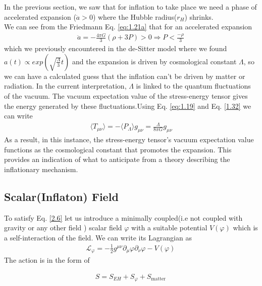 \hspace{0.5cm}In the previous section, we saw that for inflation to take place we need  a phase of accelerated expansion ($\ddot{a} > 0$) where the Hubble radius($r_{H}$) shrinks.\\
We can see from the Friedmann Eq. \ref{eq:1.21a} that for an accelerated expansion
\begin{align}
    \ddot{a} = -\frac{4 \pi G}{3}(\rho+3P) > 0 \Rightarrow P < \frac{-\rho}{3}\,\label{2.6}
\end{align}
which we previously encountered in the  de-Sitter model where we found $a(t) \propto exp(\sqrt{\frac{\Lambda}{3}}t)$ and the expansion is driven by cosmological constant $\Lambda$, so we can have a calculated guess that the inflation can't be driven by matter or radiation. In the current  interpretation, $\Lambda$ is linked to the quantum fluctuations of the vacuum. The  vacuum expectation value of the stress-energy tensor gives the energy generated by these fluctuations.Using Eq. \ref{eq:1.19} and Eq. \ref{1.32} we can write
\\
\begin{align}
    \langle T_{\mu\nu} \rangle = -\langle P_{\Lambda} \rangle g_{\mu\nu} = \frac{\Lambda}{8\pi G} g_{\mu\nu} \label{2.7}
\end{align}
As a result, in this instance, the stress-energy tensor's vacuum expectation value functions as the cosmological constant that promotes the expansion. This provides an indication of what to anticipate from a theory describing the inflationary mechanism.

\subsection{Scalar(Inflaton) Field }





\hspace{0.5cm}To satisfy Eq. \ref{2.6} let us introduce a minimally coupled(i.e not coupled with gravity or any other field ) scalar field \(\varphi\)  with a suitable potential $V(\varphi)$ which is a self-interaction of the field. We can write its Lagrangian as 
\begin{align}
    \mathscr{L}_{\varphi} = -\frac{1}{2} g^{\mu\nu} \partial_{\mu}\varphi\partial_{\nu}\varphi - V(\varphi)\, \label{2.8}
\end{align}
The action is in the form of 

\begin{align}
    S = S_{EH} + S_\varphi + S _{\text{matter}}\,\label{2.9}
\end{align}

